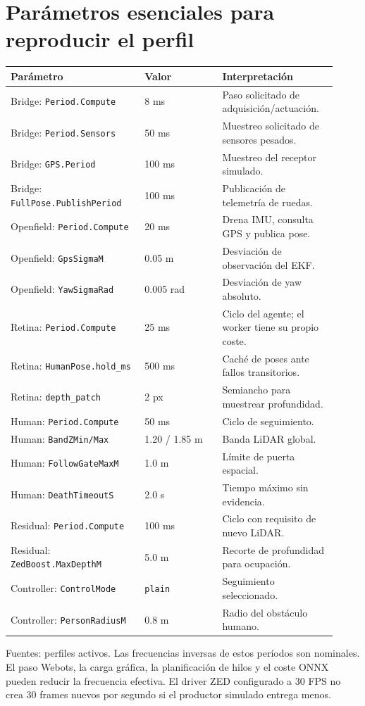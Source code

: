 \documentclass[11pt,a4paper]{article}
\newcommand{\code}[1]{\nolinkurl{#1}}
\begin{document}
\section{Parámetros esenciales para reproducir el perfil}
\begin{longtable}{p{0.38\linewidth}p{0.22\linewidth}p{0.32\linewidth}}
\toprule Parámetro & Valor & Interpretación \\
\midrule\endhead
Bridge: \code{Period.Compute} & 8 ms & Paso solicitado de adquisición/actuación. \\
Bridge: \code{Period.Sensors} & 50 ms & Muestreo solicitado de sensores pesados. \\
Bridge: \code{GPS.Period} & 100 ms & Muestreo del receptor simulado. \\
Bridge: \code{FullPose.PublishPeriod} & 100 ms & Publicación de telemetría de ruedas. \\
Openfield: \code{Period.Compute} & 20 ms & Drena IMU, consulta GPS y publica pose. \\
Openfield: \code{GpsSigmaM} & 0.05 m & Desviación de observación del EKF. \\
Openfield: \code{YawSigmaRad} & 0.005 rad & Desviación de yaw absoluto. \\
Retina: \code{Period.Compute} & 25 ms & Ciclo del agente; el worker tiene su propio coste. \\
Retina: \code{HumanPose.hold_ms} & 500 ms & Caché de poses ante fallos transitorios. \\
Retina: \code{depth_patch} & 2 px & Semiancho para muestrear profundidad. \\
Human: \code{Period.Compute} & 50 ms & Ciclo de seguimiento. \\
Human: \code{BandZMin/Max} & 1.20 / 1.85 m & Banda LiDAR global. \\
Human: \code{FollowGateMaxM} & 1.0 m & Límite de puerta espacial. \\
Human: \code{DeathTimeoutS} & 2.0 s & Tiempo máximo sin evidencia. \\
Residual: \code{Period.Compute} & 100 ms & Ciclo con requisito de nuevo LiDAR. \\
Residual: \code{ZedBoost.MaxDepthM} & 5.0 m & Recorte de profundidad para ocupación. \\
Controller: \code{ControlMode} & \code{plain} & Seguimiento seleccionado. \\
Controller: \code{PersonRadiusM} & 0.8 m & Radio del obstáculo humano. \\
\bottomrule
\end{longtable}
Fuentes: perfiles activos. Las frecuencias inversas de estos períodos son nominales.
El paso Webots, la carga gráfica, la planificación de hilos y el coste ONNX pueden
reducir la frecuencia efectiva. El driver ZED configurado a 30 FPS no crea 30 frames
nuevos por segundo si el productor simulado entrega menos.~\cite{bridgeconfig,openconfig,retinaconfig,humanconfig,resconfig,controllerconfig,zedconfig}
\end{document}
